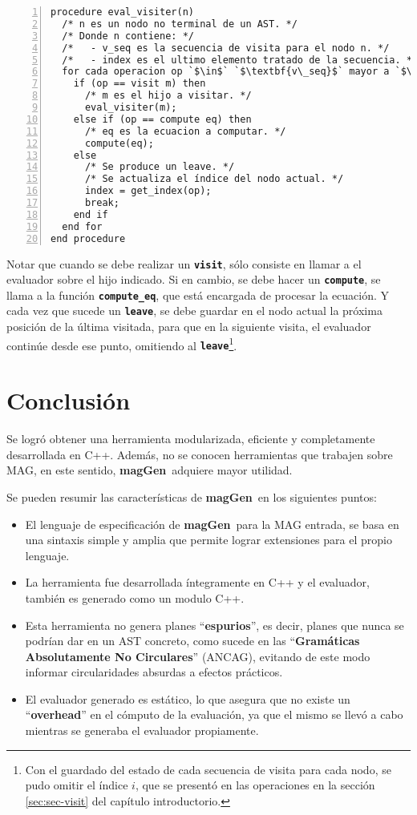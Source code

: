 \documentclass[runningheads,a4paper]{llncs}
\newcommand{\textbtt}[1]{\texttt{\textbf{#1}}}
\newcommand{\maggen}{\textbf{magGen}}
\begin{document}
\begin{lstlisting}[numbers=left, columns=fullflexible]
procedure eval_visiter(n)
  /* n es un nodo no terminal de un AST. */
  /* Donde n contiene: */
  /*   - v_seq es la secuencia de visita para el nodo n. */
  /*   - index es el ultimo elemento tratado de la secuencia. */
  for cada operacion op `$\in$` `$\textbf{v\_seq}$` mayor a `$\textbf{index}$` do
    if (op == visit m) then
      /* m es el hijo a visitar. */
      eval_visiter(m);
    else if (op == compute eq) then
      /* eq es la ecuacion a computar. */
      compute(eq);
    else
      /* Se produce un leave. */
      /* Se actualiza el índice del nodo actual. */
      index = get_index(op);
      break;
    end if
  end for
end procedure
\end{lstlisting}

Notar que cuando se debe realizar un \textbtt{visit}, sólo consiste en llamar a el evaluador sobre el hijo indicado. Si en cambio, se debe hacer un \textbtt{compute}, se llama a la función \textbtt{compute\_eq}, que está encargada de procesar la ecuación. Y cada vez que sucede un \textbtt{leave}, se debe guardar en el nodo actual la próxima posición de la última visitada, para que en la siguiente visita, el evaluador continúe desde ese punto, omitiendo al \textbtt{leave}\footnote{Con el guardado del estado de cada secuencia de visita para cada nodo, se pudo omitir el índice $i$, que se presentó en las operaciones en la sección \ref{sec:sec-visit} del capítulo introductorio.}.

\section{Conclusión}

Se logró obtener una herramienta modularizada, eficiente y completamente desarrollada en C++. Además, no se conocen herramientas que trabajen sobre MAG, en este sentido, \maggen\ adquiere mayor utilidad. 

Se pueden resumir las características de \maggen\ en los siguientes puntos:

\begin{itemize}
\item El lenguaje de especificación de \maggen\ para la MAG entrada, se basa en una sintaxis simple y amplia que permite lograr extensiones para el propio lenguaje.

\item La herramienta fue desarrollada íntegramente en C++ y el evaluador, también es generado como un modulo C++. 

\item Esta herramienta no genera planes ``\textbf{espurios}'', es decir, planes que nunca se podrían dar en un AST concreto, como sucede en las ``\textbf{Gramáticas Absolutamente No Circulares}'' (ANCAG), evitando de este modo informar circularidades absurdas a efectos prácticos.

\item El evaluador generado es estático, lo que asegura que no existe un ``\textbf{overhead}'' en el cómputo de la evaluación, ya que el mismo se llevó a cabo mientras se generaba el evaluador propiamente.
\end{itemize}
\end{document}
